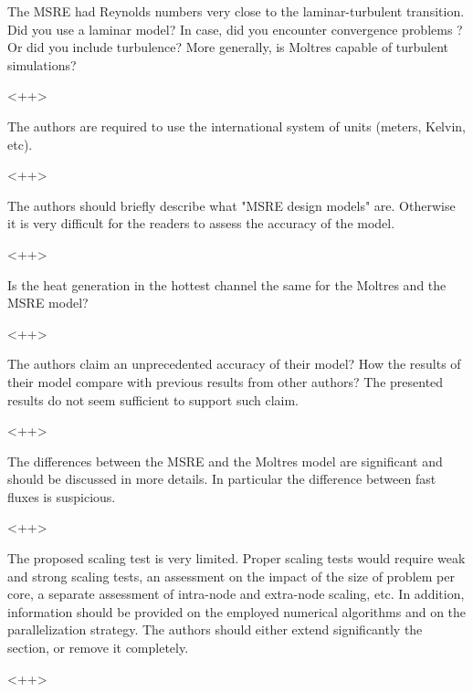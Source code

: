 \documentclass[answers,11pt]{exam}
\begin{document}
\begin{questions}
\question  The MSRE had Reynolds numbers very close to the laminar-turbulent transition. Did you use a laminar model? In case, did you encounter convergence problems ?
Or did you include turbulence? More generally, is Moltres capable of turbulent simulations?

\begin{solution}
<++>
\end{solution}



\question The authors are required to use the international system of units (meters, Kelvin, etc).

\begin{solution}
<++>
\end{solution}


\question The authors should briefly describe what "MSRE design models" are. Otherwise it is very difficult for the readers to assess the accuracy of the model.

\begin{solution}
<++>
\end{solution}


\question  Is the heat generation in the hottest channel the same for the Moltres and the MSRE model?

\begin{solution}
<++>
\end{solution}


\question  The authors claim an unprecedented accuracy of their model? How the results of their model compare with previous results from other authors? The presented results do not seem sufficient to support such claim.

\begin{solution}
<++>
\end{solution}

\question The differences between the MSRE and the Moltres model are significant and should be discussed in more details. In particular the difference between fast fluxes is suspicious.

\begin{solution}
<++>
\end{solution}
  
\question The proposed scaling test is very limited. Proper scaling tests would require weak and strong scaling tests, an assessment on the impact of the size of problem per core, a separate assessment of intra-node and extra-node scaling, etc. In addition, information should be provided on the employed numerical algorithms and on the parallelization strategy. The authors should either extend significantly the section, or remove it completely.

\begin{solution}
<++>
\end{solution}
\end{questions}
\end{document}
